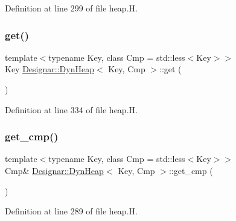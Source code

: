 Definition at line 299 of file heap.\+H.

\mbox{\label{class_designar_1_1_dyn_heap_adead89301910d07cf6e019ad35b549ad}} 
\subsubsection{\texorpdfstring{get()}{get()}}
{\footnotesize\ttfamily template$<$typename Key, class Cmp = std\+::less$<$\+Key$>$$>$ \\
Key \hyperlink{class_designar_1_1_dyn_heap}{Designar\+::\+Dyn\+Heap}$<$ Key, Cmp $>$\+::get (\begin{DoxyParamCaption}{ }\end{DoxyParamCaption})\hspace{0.3cm}{\ttfamily [inline]}}



Definition at line 334 of file heap.\+H.

\mbox{\label{class_designar_1_1_dyn_heap_a4f1357b3883f314adbd2b7bb100636b3}} 
\subsubsection{\texorpdfstring{get\+\_\+cmp()}{get\_cmp()}\hspace{0.1cm}{\footnotesize\ttfamily [1/2]}}
{\footnotesize\ttfamily template$<$typename Key, class Cmp = std\+::less$<$\+Key$>$$>$ \\
Cmp\& \hyperlink{class_designar_1_1_dyn_heap}{Designar\+::\+Dyn\+Heap}$<$ Key, Cmp $>$\+::get\+\_\+cmp (\begin{DoxyParamCaption}{ }\end{DoxyParamCaption})\hspace{0.3cm}{\ttfamily [inline]}}



Definition at line 289 of file heap.\+H.

\mbox{\label{class_designar_1_1_dyn_heap_a2c5b0b169216b30f44cc26338d3866b1}} 
